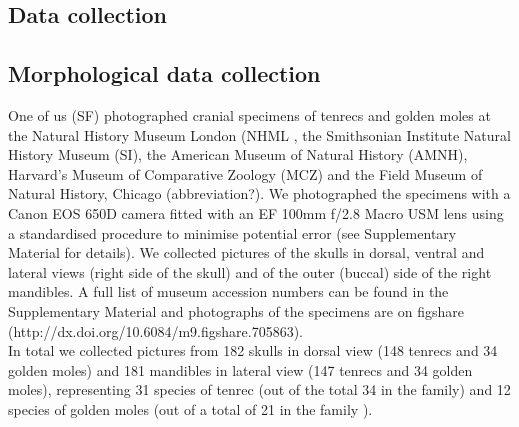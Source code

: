 \documentclass[12pt,a4paper]{article}
\begin{document}
\subsection{Data collection} %

\subsection{Morphological data collection} %

One of us (SF) photographed cranial specimens of tenrecs and golden moles at the Natural History Museum London (NHML %
, the Smithsonian Institute Natural History Museum (SI), the American Museum of Natural History (AMNH), Harvard's Museum of Comparative Zoology (MCZ) and the Field Museum of Natural History, Chicago (abbreviation?). We photographed the specimens with a Canon EOS 650D camera fitted with an EF 100mm f/2.8 Macro USM lens using a standardised procedure to minimise potential error (see Supplementary Material for details).
We collected pictures of the skulls in dorsal, ventral and lateral views (right side of the skull) and of the outer (buccal) side of the right mandibles. A full list of museum accession numbers can be found in the Supplementary Material and photographs of the specimens are on figshare (http://dx.doi.org/10.6084/m9.figshare.705863).\\

In total we collected pictures from 182 skulls in dorsal view (148 tenrecs and 34 golden moles) and 181 mandibles in lateral view (147 tenrecs and 34 golden moles), representing 31 species of tenrec (out of the total 34 in the family) and 12 species of golden moles (out of a total of 21 in the family \citep{Asher2010}). %
	
\end{document}
